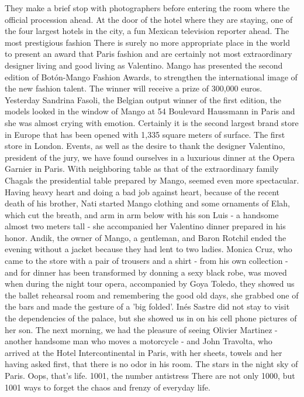 They make a brief stop with photographers before entering the room where the official procession ahead.
At the door of the hotel where they are staying, one of the four largest hotels in the city, a fun Mexican television reporter ahead.
The most prestigious fashion
There is surely no more appropriate place in the world to present an award that Paris fashion and are certainly not most extraordinary designer living and good living as Valentino.
Mango has presented the second edition of Botón-Mango Fashion Awards, to strengthen the international image of the new fashion talent.
The winner will receive a prize of 300,000 euros.
Yesterday Sandrina Fasoli, the Belgian output winner of the first edition, the models looked in the window of Mango at 54 Boulevard Haussmann in Paris and she was almost crying with emotion.
Certainly it is the second largest brand store in Europe that has been opened with 1,335 square meters of surface.
The first store in London.
Events, as well as the desire to thank the designer Valentino, president of the jury, we have found ourselves in a luxurious dinner at the Opera Garnier in Paris.
With neighboring table as that of the extraordinary family Chagals the presidential table prepared by Mango, seemed even more spectacular.
Having heavy heart and doing a bad job against heart, because of the recent death of his brother, Nati started Mango clothing and some ornaments of Elah, which cut the breath, and arm in arm below with his son Luis - a handsome almost two meters tall - she accompanied her Valentino dinner prepared in his honor.
Andik, the owner of Mango, a gentleman, and Baron Rotchil ended the evening without a jacket because they had lent to two ladies.
Monica Cruz, who came to the store with a pair of trousers and a shirt - from his own collection - and for dinner has been transformed by donning a sexy black robe, was moved when during the night tour opera, accompanied by Goya Toledo, they showed us the ballet rehearsal room and remembering the good old days, she grabbed one of the bars and made the gesture of a 'big folded'.
Inés Sastre did not stay to visit the dependencies of the palace, but she showed us in on his cell phone pictures of her son.
The next morning, we had the pleasure of seeing Olivier Martinez - another handsome man who moves a motorcycle - and John Travolta, who arrived at the Hotel Intercontinental in Paris, with her sheets, towels and her having asked first, that there is no odor in his room.
The stars in the night sky of Paris.
Oops, that's life.
1001, the number antistress
There are not only 1000, but 1001 ways to forget the chaos and frenzy of everyday life.
